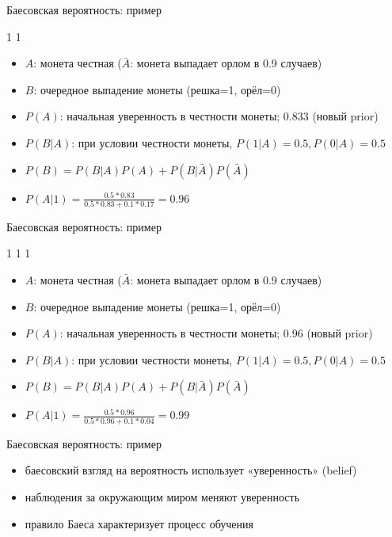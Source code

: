 \documentclass[10pt]{beamer}
\begin{document}
\begin{frame}{Баесовская вероятность: пример}
  \begin{center}
    1 1
  \end{center}
  \begin{itemize}
  \item $A$: монета честная ($\bar{A}$: монета выпадает орлом в 0.9 случаев)
  \item $B$: очередное выпадение монеты (решка=1, орёл=0)
  \item $P(A)$: начальная уверенность в честности монеты; 0.833 (новый
    prior)
  \item $P(B|A)$: при условии честности монеты, $P(1|A)=0.5,
    P(0|A)=0.5$
  \item $P(B) = P(B|A)P(A) + P(B|\bar{A})P(\bar{A})$
  \item $P(A|1)=\frac{0.5 * 0.83}{0.5 * 0.83 + 0.1 * 0.17} = 0.96$
  \end{itemize}
\end{frame}

\begin{frame}{Баесовская вероятность: пример}
  \begin{center}
    1 1 1
  \end{center}
  \begin{itemize}
  \item $A$: монета честная ($\bar{A}$: монета выпадает орлом в 0.9 случаев)
  \item $B$: очередное выпадение монеты (решка=1, орёл=0)
  \item $P(A)$: начальная уверенность в честности монеты; 0.96 (новый
    prior)
  \item $P(B|A)$: при условии честности монеты, $P(1|A)=0.5,
    P(0|A)=0.5$
  \item $P(B) = P(B|A)P(A) + P(B|\bar{A})P(\bar{A})$
  \item $P(A|1)=\frac{0.5 * 0.96}{0.5 * 0.96 + 0.1 * 0.04} = 0.99$
  \end{itemize}
\end{frame}

\begin{frame}{Баесовская вероятность: пример}
  \begin{itemize}
  \item баесовский взгляд на вероятность использует «уверенность»
    (belief)
  \item наблюдения за окружающим миром меняют уверенность
  \item правило Баеса характеризует процесс обучения
  \end{itemize}
\end{frame}
\end{document}

